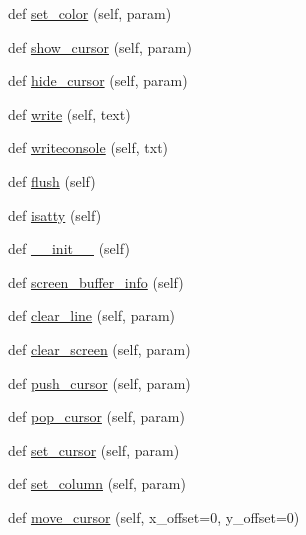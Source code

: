 \begin{DoxyCompactItemize}
\item 
def \hyperlink{classwaflib_1_1ansiterm_1_1_ansi_term_a2b56ee3c8294f7e2e5bca7cc60e8ee05}{set\+\_\+color} (self, param)
\item 
def \hyperlink{classwaflib_1_1ansiterm_1_1_ansi_term_a594f6cf62d5e4ca33f2b88127fd6393d}{show\+\_\+cursor} (self, param)
\item 
def \hyperlink{classwaflib_1_1ansiterm_1_1_ansi_term_a2ca4bde33edd4afa92c8bda3f01d1dc9}{hide\+\_\+cursor} (self, param)
\item 
def \hyperlink{classwaflib_1_1ansiterm_1_1_ansi_term_a03ecdf1c9e54a69800aae320175c281b}{write} (self, text)
\item 
def \hyperlink{classwaflib_1_1ansiterm_1_1_ansi_term_a8296f875a3fd0a03fc109073f2a73a3e}{writeconsole} (self, txt)
\item 
def \hyperlink{classwaflib_1_1ansiterm_1_1_ansi_term_a08667242c11cdfd8b74d64f8191d4938}{flush} (self)
\item 
def \hyperlink{classwaflib_1_1ansiterm_1_1_ansi_term_a08e698612e76adc1aa3e26cdc5cb2009}{isatty} (self)
\item 
def \hyperlink{classwaflib_1_1ansiterm_1_1_ansi_term_ab397a7401f836bb9f96d9e54c6333821}{\+\_\+\+\_\+init\+\_\+\+\_\+} (self)
\item 
def \hyperlink{classwaflib_1_1ansiterm_1_1_ansi_term_afdb1bac8f2508bdf2279320b85286196}{screen\+\_\+buffer\+\_\+info} (self)
\item 
def \hyperlink{classwaflib_1_1ansiterm_1_1_ansi_term_ae9df276c42e0569ad63c20c19de62b93}{clear\+\_\+line} (self, param)
\item 
def \hyperlink{classwaflib_1_1ansiterm_1_1_ansi_term_aa94cc04f29c4c51e0013e5cb87c0fd07}{clear\+\_\+screen} (self, param)
\item 
def \hyperlink{classwaflib_1_1ansiterm_1_1_ansi_term_a9f489138508401c64c6927f215d8d6da}{push\+\_\+cursor} (self, param)
\item 
def \hyperlink{classwaflib_1_1ansiterm_1_1_ansi_term_a2093c2f7ded18188b0bf2989a0083a18}{pop\+\_\+cursor} (self, param)
\item 
def \hyperlink{classwaflib_1_1ansiterm_1_1_ansi_term_aba842837a7fe351aa8459aa375249c69}{set\+\_\+cursor} (self, param)
\item 
def \hyperlink{classwaflib_1_1ansiterm_1_1_ansi_term_acd65956a7d56681cc669acca5bdd43fb}{set\+\_\+column} (self, param)
\item 
def \hyperlink{classwaflib_1_1ansiterm_1_1_ansi_term_ade95c6eb1c7ed7928780aad4e6b4e268}{move\+\_\+cursor} (self, x\+\_\+offset=0, y\+\_\+offset=0)

\end{DoxyCompactItemize}
